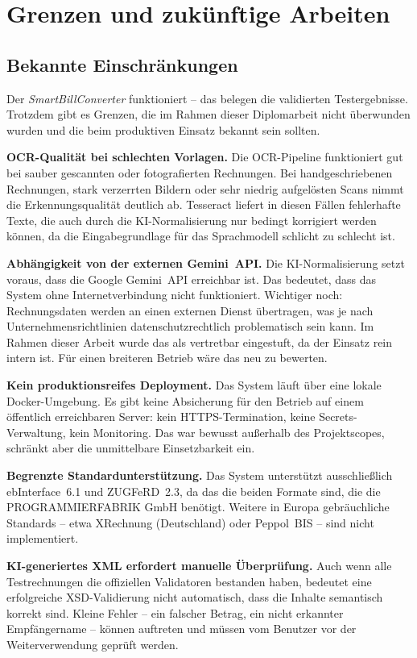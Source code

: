 \chapter{Grenzen und zukünftige Arbeiten}
\label{chap:grenzen_zukunft}

\section{Bekannte Einschränkungen}
Der \textit{SmartBillConverter} funktioniert -- das belegen die validierten Testergebnisse.
Trotzdem gibt es Grenzen, die im Rahmen dieser Diplomarbeit nicht überwunden wurden
und die beim produktiven Einsatz bekannt sein sollten.

\textbf{OCR-Qualität bei schlechten Vorlagen.}
Die OCR-Pipeline funktioniert gut bei sauber gescannten oder fotografierten Rechnungen.
Bei handgeschriebenen Rechnungen, stark verzerrten Bildern oder sehr niedrig aufgelösten
Scans nimmt die Erkennungsqualität deutlich ab. Tesseract liefert in diesen Fällen
fehlerhafte Texte, die auch durch die KI-Normalisierung nur bedingt korrigiert werden
können, da die Eingabegrundlage für das Sprachmodell schlicht zu schlecht ist.

\textbf{Abhängigkeit von der externen Gemini~API.}
Die KI-Normalisierung setzt voraus, dass die Google Gemini~API erreichbar ist.
Das bedeutet, dass das System ohne Internetverbindung nicht funktioniert.
Wichtiger noch: Rechnungsdaten werden an einen externen Dienst übertragen,
was je nach Unternehmensrichtlinien datenschutzrechtlich problematisch sein kann.
Im Rahmen dieser Arbeit wurde das als vertretbar eingestuft, da der Einsatz
rein intern ist. Für einen breiteren Betrieb wäre das neu zu bewerten.

\textbf{Kein produktionsreifes Deployment.}
Das System läuft über eine lokale Docker-Umgebung. Es gibt keine Absicherung
für den Betrieb auf einem öffentlich erreichbaren Server: kein HTTPS-Termination,
keine Secrets-Verwaltung, kein Monitoring. Das war bewusst außerhalb des
Projektscopes, schränkt aber die unmittelbare Einsetzbarkeit ein.

\textbf{Begrenzte Standardunterstützung.}
Das System unterstützt ausschließlich ebInterface~6.1 und ZUGFeRD~2.3,
da das die beiden Formate sind, die die PROGRAMMIERFABRIK GmbH benötigt.
Weitere in Europa gebräuchliche Standards -- etwa XRechnung (Deutschland)
oder Peppol~BIS -- sind nicht implementiert.

\textbf{KI-generiertes XML erfordert manuelle Überprüfung.}
Auch wenn alle Testrechnungen die offiziellen Validatoren bestanden haben,
bedeutet eine erfolgreiche XSD-Validierung nicht automatisch, dass die Inhalte
semantisch korrekt sind. Kleine Fehler -- ein falscher Betrag, ein nicht
erkannter Empfängername -- können auftreten und müssen vom Benutzer vor der
Weiterverwendung geprüft werden.

